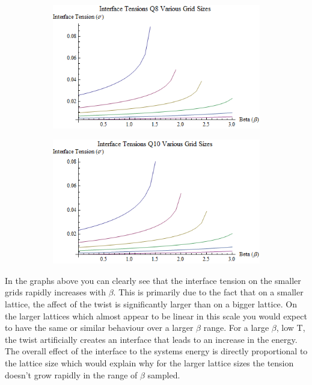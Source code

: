 \begin{figure}[H]
\begin{subfigure}[b]{0.45\textwidth}
\end{subfigure}

\begin{subfigure}[b]{0.45\textwidth}
    \includegraphics[width=\textwidth]{4-Results/Q8VariousGridSizesTensions.png}

\end{subfigure}
\begin{subfigure}[b]{0.45\textwidth}
    \includegraphics[width=\textwidth]{4-Results/Q10VariousGridSizesTensions.png}

\end{subfigure}
\end{figure}

In the graphs above you can clearly see that the interface tension on the smaller grids rapidly increases with $\beta$. This is primarily due to the fact that on a smaller lattice, the affect of the twist is significantly larger than on a bigger lattice.
On the larger lattices which almost appear to be linear in this scale you would expect to have the same or similar behaviour over a larger $\beta$ range.
For a large $\beta$, low T, the twist artificially creates an interface that leads to an increase in the energy. The overall effect of the interface to the systems energy is directly proportional to the lattice size which would explain why for the larger lattice sizes the tension doesn't grow rapidly in the range of $\beta$ sampled.